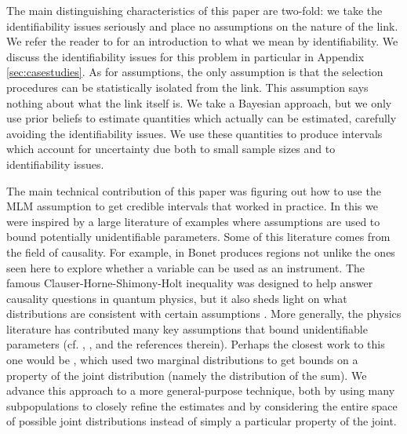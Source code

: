 The main distinguishing characteristics of this paper are two-fold: we take the identifiability issues seriously and place no assumptions on the nature of the link.  We refer the reader to \cite{walter2014identifiability} for an introduction to what we mean by identifiability.  We discuss the identifiability issues for this problem in particular in Appendix \ref{sec:casestudies}.  As for assumptions, the only assumption is that the selection procedures can be statistically isolated from the link.  This assumption says nothing about what the link itself is.  We take a Bayesian approach, but we only use prior beliefs to estimate quantities which actually can be estimated, carefully avoiding the identifiability issues.  We use these quantities to produce intervals which account for uncertainty due both to small sample sizes and to identifiability issues.

The main technical contribution of this paper was figuring out how to use the MLM assumption to get credible intervals that worked in practice.  In this we were inspired by a large literature of examples where assumptions are used to bound potentially unidentifiable parameters.  Some of this literature comes from the field of causality.  For example, in \cite{bonet2001instrumentality} Bonet produces regions not unlike the ones seen here to explore whether a variable can be used as an instrument.  The famous Clauser-Horne-Shimony-Holt inequality was designed to help answer causality questions in quantum physics, but it also sheds light on what distributions are consistent with certain assumptions \cite{clauser1969proposed}.  More generally, the physics literature has contributed many key assumptions that bound unidentifiable parameters (cf. \cite{chaves2014inferring}, \cite{kela2017semidefinite}, and the references therein).  Perhaps the closest work to this one would be \cite{makarov1982estimates}, which used two marginal distributions to get bounds on a property of the joint distribution (namely the distribution of the sum).  We advance this approach to a more general-purpose technique, both by using many subpopulations to closely refine the \MLM{} estimates and by considering the entire space of possible joint distributions instead of simply a particular property of the joint.  

%                                                    


